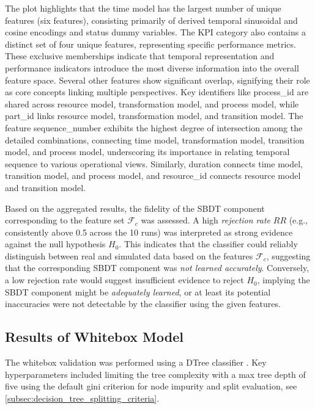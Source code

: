 The plot highlights that the time model has the largest number of unique features (six features), consisting primarily of derived temporal sinusoidal and cosine encodings and status dummy variables. The KPI category also contains a distinct set of four unique features, representing specific performance metrics. These exclusive memberships indicate that temporal representation and performance indicators introduce the most diverse information into the overall feature space.
Several other features show significant overlap, signifying their role as core concepts linking multiple perspectives. Key identifiers like process\_id are shared across resource model, transformation model, and process model, while part\_id links resource model, transformation model, and transition model. The feature sequence\_number exhibits the highest degree of intersection among the detailed combinations, connecting time model, transformation model, transition model, and process model, underscoring its importance in relating temporal sequence to various operational views. Similarly, duration connects time model, transition model, and process model, and resource\_id connects resource model and transition model.

Based on the aggregated results, the fidelity of the SBDT component corresponding to the feature set $\mathcal{F}_c$ was assessed. A high \textit{rejection rate} $RR$ (e.g., consistently above 0.5 across the 10 runs) was interpreted as strong evidence against the null hypothesis $H_0$. This indicates that the classifier could reliably distinguish between real and simulated data based on the features $\mathcal{F}_c$, suggesting that the corresponding SBDT component was \textit{not learned accurately}. Conversely, a low rejection rate would suggest insufficient evidence to reject $H_0$, implying the SBDT component might be \textit{adequately learned}, or at least its potential inaccuracies were not detectable by the classifier using the given features.

\subsection*{Results of Whitebox Model}
\label{sec:results-whitebox}
The whitebox validation was performed using a DTree classifier \autocite{Scikit-Learn}. Key hyperparameters included limiting the tree complexity with a max tree depth of five using the default gini criterion for node impurity and split evaluation, see \autoref{subsec:decision_tree_splitting_criteria}.

